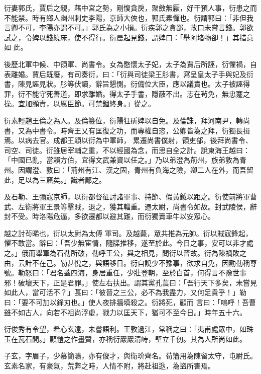 \begin{pinyinscope}
 衍妻郭氏，賈后之親，藉中宮之勢，剛愎貪戾，聚斂無厭，好干預人事，衍患之而不能禁。時有鄉人幽州刺史李陽，京師大俠也，郭氏素憚也。衍謂郭曰：「非但我言卿不可，李陽亦謂不可。」郭氏為之小損。衍疾郭之貪鄙，故口未嘗言錢。郭欲試之，令婢以錢繞床，使不得行。衍晨起見錢，謂婢曰：「舉阿堵物卻！」其措意如
 此。



 後歷北軍中候、中領軍、尚書令。女為愍懷太子妃，太子為賈后所誣，衍懼禍，自表離婚。賈后既廢，有司奏衍，曰：「衍與司徒梁王肜書，寫呈皇太子手與妃及衍書，陳見誣見狀。肜等伏讀，辭旨懇惻。衍備位大臣，應以議責也。太子被誣得罪，衍不能守死善道，即求離婚。得太子手書，隱蔽不出。志在茍免，無忠蹇之操。宜加顯責，以厲臣節。可禁錮終身。」從之。



 衍素輕趙王倫之為人。及倫篡位，衍陽狂斫婢以自免。及倫誅，拜河南尹，轉尚書，又為中書令。時齊王乂有匡復之功，而專權自恣，公卿皆為之拜，衍獨長揖焉。以病去官。成都王穎以衍為中軍師，
 累遷尚書僕射，領吏部，後拜尚書令、司空、司徒。衍雖居宰輔之重，不以經國為念，而思自全之計。說東海王越曰：「中國已亂，當賴方伯，宜得文武兼資以任之。」乃以弟澄為荊州，族弟敦為青州。因謂澄、敦曰：「荊州有江、漢之固，青州有負海之險，卿二人在外，而吾留此，足以為三窟矣。」識者鄙之。



 及石勒、王彌寇京師，以衍都督征討諸軍事、持節、假黃鉞以距之。衍使前將軍曹武、左衛將軍王景等擊賊，退之，獲其輜重。遷太尉，尚書令如故。封武陵侯，辭封不受。時洛陽危逼，多欲遷都以避其難，而衍獨賣車牛以安眾心。



 越之討茍晞也，衍以太尉為太傅
 軍司。及越薨，眾共推為元帥。衍以賊寇鋒起，懼不敢當。辭曰：「吾少無宦情，隨牒推移，遂至於此。今日之事，安可以非才處之。」俄而舉軍為石勒所破，勒呼王公，與之相見，問衍以晉故。衍為陳禍敗之由，云計不在己。勒甚悅之，與語移日。衍自說少不豫事，欲求自免，因勸勒稱尊號。勒怒曰：「君名蓋四海，身居重任，少壯登朝，至於白首，何得言不豫世事邪！破壞天下，正是君罪。」使左右扶出。謂其黨孔萇曰：「吾行天下多矣，未嘗見如此人，當可活不？」萇曰：「彼晉之三公，必不為我盡力，又何足貴乎！」勒曰：「要不可加以鋒刃也。」使人夜排牆填殺之。衍將死，顧而
 言曰：「嗚呼！吾曹雖不如古人，向若不祖尚浮虛，戮力以匡天下，猶可不至今日。」時年五十六。



 衍俊秀有令望，希心玄遠，未嘗語利。王敦過江，常稱之曰：「夷甫處眾中，如珠玉在瓦石間。」顧愷之作畫贊，亦稱衍巖巖清峙，壁立千仞。其為人所尚如此。



 子玄，字眉子，少慕簡曠，亦有俊才，與衛玠齊名。荀籓用為陳留太守，屯尉氏。玄素名家，有豪氣，荒弊之時，人情不附，將赴祖逖，為盜所害焉。




\end{pinyinscope}
